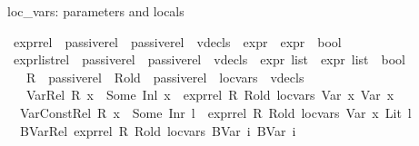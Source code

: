 \begin{isabellebody}
\begin{isamarkuptext}
       loc_vars: parameters and locals%
\end{isamarkuptext}\isamarkuptrue%
\isamarkupfalse%
\ expr{\isacharunderscore}{\kern0pt}rel\ {\isacharcolon}{\kern0pt}{\isacharcolon}{\kern0pt}\ {\isachardoublequoteopen}passive{\isacharunderscore}{\kern0pt}rel\ {\isasymRightarrow}\ passive{\isacharunderscore}{\kern0pt}rel\ {\isasymRightarrow}\ vdecls\ {\isasymRightarrow}\ expr\ {\isasymRightarrow}\ expr\ {\isasymRightarrow}\ bool{\isachardoublequoteclose}\ \ \isanewline
\ expr{\isacharunderscore}{\kern0pt}list{\isacharunderscore}{\kern0pt}rel\ {\isacharcolon}{\kern0pt}{\isacharcolon}{\kern0pt}\ {\isachardoublequoteopen}passive{\isacharunderscore}{\kern0pt}rel\ {\isasymRightarrow}\ passive{\isacharunderscore}{\kern0pt}rel\ {\isasymRightarrow}\ vdecls\ {\isasymRightarrow}\ expr\ list\ {\isasymRightarrow}\ expr\ list\ {\isasymRightarrow}\ bool{\isachardoublequoteclose}\isanewline
\ \ \ R\ {\isacharcolon}{\kern0pt}{\isacharcolon}{\kern0pt}\ passive{\isacharunderscore}{\kern0pt}rel\ \ R{\isacharunderscore}{\kern0pt}old\ {\isacharcolon}{\kern0pt}{\isacharcolon}{\kern0pt}\ passive{\isacharunderscore}{\kern0pt}rel\ \ loc{\isacharunderscore}{\kern0pt}vars\ {\isacharcolon}{\kern0pt}{\isacharcolon}{\kern0pt}\ vdecls\isanewline
\ \ \ \ \ \ \isanewline
\ \ \ Var{\isacharunderscore}{\kern0pt}Rel{\isacharcolon}{\kern0pt}\ {\isachardoublequoteopen}R\ x{}\ {\isacharequal}{\kern0pt}\ Some\ {\isacharparenleft}{\kern0pt}Inl\ x{}{\isacharparenright}{\kern0pt}\ {\isasymLongrightarrow}\ expr{\isacharunderscore}{\kern0pt}rel\ R\ R{\isacharunderscore}{\kern0pt}old\ loc{\isacharunderscore}{\kern0pt}vars\ {\isacharparenleft}{\kern0pt}Var\ x{}{\isacharparenright}{\kern0pt}\ {\isacharparenleft}{\kern0pt}Var\ x{}{\isacharparenright}{\kern0pt}{\isachardoublequoteclose}\isanewline
\ {\isacharbar}{\kern0pt}\ Var{\isacharunderscore}{\kern0pt}Const{\isacharunderscore}{\kern0pt}Rel{\isacharcolon}{\kern0pt}\ {\isachardoublequoteopen}R\ x{}\ {\isacharequal}{\kern0pt}\ Some\ {\isacharparenleft}{\kern0pt}Inr\ l{\isacharparenright}{\kern0pt}\ {\isasymLongrightarrow}\ expr{\isacharunderscore}{\kern0pt}rel\ R\ R{\isacharunderscore}{\kern0pt}old\ loc{\isacharunderscore}{\kern0pt}vars\ {\isacharparenleft}{\kern0pt}Var\ x{}{\isacharparenright}{\kern0pt}\ {\isacharparenleft}{\kern0pt}Lit\ l{\isacharparenright}{\kern0pt}{\isachardoublequoteclose}\isanewline
\ {\isacharbar}{\kern0pt}\ BVar{\isacharunderscore}{\kern0pt}Rel{\isacharcolon}{\kern0pt}\ {\isachardoublequoteopen}expr{\isacharunderscore}{\kern0pt}rel\ R\ R{\isacharunderscore}{\kern0pt}old\ loc{\isacharunderscore}{\kern0pt}vars\ {\isacharparenleft}{\kern0pt}BVar\ i{\isacharparenright}{\kern0pt}\ {\isacharparenleft}{\kern0pt}BVar\ i{\isacharparenright}{\kern0pt}{\isachardoublequoteclose}\isanewline

\end{isabellebody}
